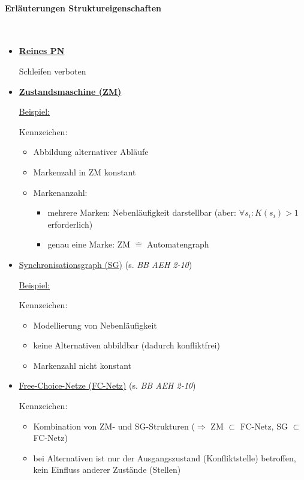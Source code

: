 \documentclass[12pt,a4paper]{scrartcl}
\numberwithin{equation}{section}
\newcommand{\properparagraph}[1]{\paragraph{#1}\mbox{}\\}
\begin{document}
\properparagraph{Erläuterungen Struktureigenschaften}
\begin{itemize}
	\item \textbf{\underline{Reines PN}}
	
	Schleifen verboten
	
	\item \textbf{\underline{Zustandsmaschine (ZM)}}
	
	\underline{Beispiel:}
	
	Kennzeichen:
	\begin{itemize}
		\item Abbildung alternativer Abläufe
		\item Markenzahl in ZM konstant
		\item Markenanzahl:
		\begin{itemize}
			\item mehrere Marken: Nebenläufigkeit darstellbar (aber: $\forall s_i: K(s_i)>1$ erforderlich)
			\item genau eine Marke: ZM $\hat{=}$ Automatengraph
		\end{itemize}
	\end{itemize}

	\item \underline{Synchronisationsgraph (SG)} (s. \textit{BB AEH 2-10})
	
	\underline{Beispiel:}
	
	Kennzeichen:
	\begin{itemize}
		\item Modellierung von Nebenläufigkeit
		\item keine Alternativen abbildbar (dadurch konfliktfrei)
		\item Markenzahl nicht konstant
	\end{itemize}

	\item \underline{Free-Choice-Netze (FC-Netz)} (s. \textit{BB AEH 2-10})
	
	Kennzeichen:
	\begin{itemize}
		\item Kombination von ZM- und SG-Strukturen \newline ($\Rightarrow$ ZM $\subset$ FC-Netz, SG $\subset$ FC-Netz)
		\item bei Alternativen ist nur der Ausgangszustand (Konfliktstelle) betroffen, kein Einfluss anderer Zustände (Stellen)
	\end{itemize}
\end{itemize}
\end{document}
